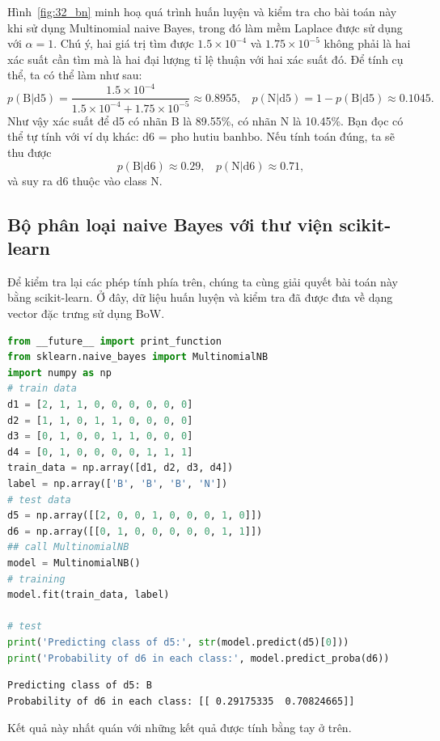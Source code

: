 Hình~\ref{fig:32_bn} minh hoạ quá trình huấn luyện và kiểm tra cho bài toán này
khi sử dụng Multinomial naive Bayes, trong đó làm mềm Laplace được sử dụng với
$\alpha = 1$. Chú ý, hai giá trị tìm được $1.5\times 10^{-4}$ và $1.75\times 10^{-5}$ không phải là hai xác suất cần tìm mà là hai đại lượng {tỉ lệ thuận} với hai xác suất đó. Để tính cụ thể, ta có thể làm như sau:
\begin{equation*} 
p(\text{B} | \text{d5}) = \frac{1.5\times 10^{-4}}{1.5\times 10^{-4} + 1.75\times 10^{-5}} \approx 0.8955, ~~~~ p(\text{N} | \text{d5}) = 1 - p(\text{B} | \text{d5}) \approx 0.1045. 
\end{equation*} 
Như vậy xác suất để d5 có nhãn B là 89.55\%, có nhãn N là 10.45\%. 
Bạn đọc có thể tự tính với ví dụ khác: $\text{d6 = pho hutiu banhbo}$. Nếu tính toán đúng, ta sẽ thu được  
\begin{equation*} 
p(\text{B} | \text{d6}) \approx 0.29, ~~~~ p(\text{N} | \text{d6}) \approx 0.71, 
\end{equation*} 
và suy ra $\text{d6}$ thuộc vào class N. 
 
\subsection{Bộ phân loại naive Bayes với thư viện scikit-learn}
 
Để kiểm tra lại các phép tính phía trên, chúng ta cùng giải quyết bài toán này bằng scikit-learn. Ở đây, dữ liệu huấn luyện và kiểm tra đã được đưa về dạng vector đặc trưng sử dụng BoW. 
\newpage  
\begin{lstlisting}[language=Python]
from __future__ import print_function 
from sklearn.naive_bayes import MultinomialNB 
import numpy as np  
# train data 
d1 = [2, 1, 1, 0, 0, 0, 0, 0, 0] 
d2 = [1, 1, 0, 1, 1, 0, 0, 0, 0] 
d3 = [0, 1, 0, 0, 1, 1, 0, 0, 0] 
d4 = [0, 1, 0, 0, 0, 0, 1, 1, 1] 
train_data = np.array([d1, d2, d3, d4]) 
label = np.array(['B', 'B', 'B', 'N'])  
# test data 
d5 = np.array([[2, 0, 0, 1, 0, 0, 0, 1, 0]]) 
d6 = np.array([[0, 1, 0, 0, 0, 0, 0, 1, 1]]) 
## call MultinomialNB 
model = MultinomialNB() 
# training  
model.fit(train_data, label) 

# test 
print('Predicting class of d5:', str(model.predict(d5)[0])) 
print('Probability of d6 in each class:', model.predict_proba(d6)) 
\end{lstlisting}
 \kq
\begin{lstlisting}
Predicting class of d5: B 
Probability of d6 in each class: [[ 0.29175335  0.70824665]] 
\end{lstlisting}
Kết quả này nhất quán với những kết quả được tính bằng tay ở trên. 
 
